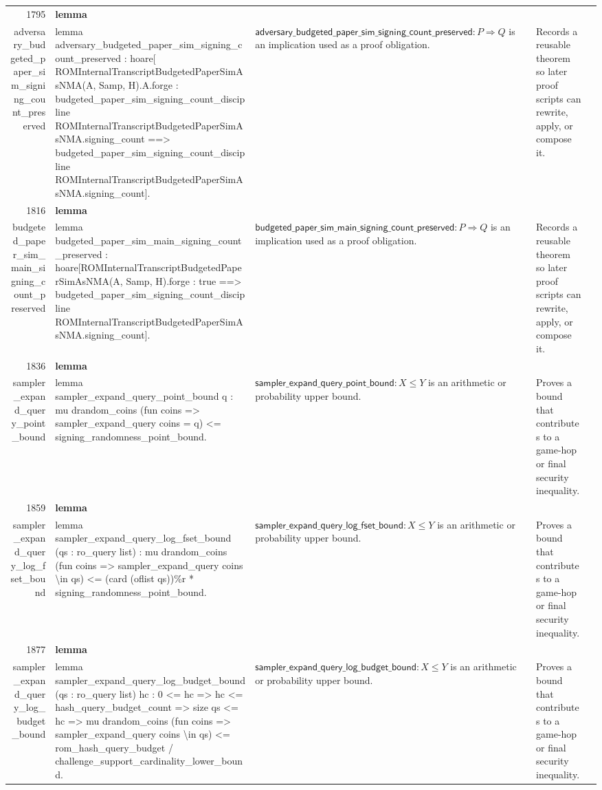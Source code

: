 \documentclass[10pt]{article}
\newcommand{\ec}[1]{\begingroup\ttfamily\scriptsize #1\endgroup}
\begin{document}
\begin{longtable}{r L{0.17\textwidth} L{0.26\textwidth} L{0.27\textwidth} L{0.20\textwidth}}
1795 & \textbf{lemma}\\\ec{adversary\_budgeted\_paper\_sim\_signing\_count\_preserved} & \ec{lemma adversary\_budgeted\_paper\_sim\_signing\_count\_preserved : hoare[ ROMInternalTranscriptBudgetedPaperSimAsNMA(A, Samp, H).A.forge : budgeted\_paper\_sim\_signing\_count\_discipline ROMInternalTranscriptBudgetedPaperSimAsNMA.signing\_count ==> budgeted\_paper\_sim\_signing\_count\_discipline ROMInternalTranscriptBudgetedPaperSimAsNMA.signing\_count].} & \(\mathsf{adversary\_budgeted\_paper\_sim\_signing\_count\_preserved} : P \Rightarrow Q\) is an implication used as a proof obligation. & Records a reusable theorem so later proof scripts can rewrite, apply, or compose it. \\
1816 & \textbf{lemma}\\\ec{budgeted\_paper\_sim\_main\_signing\_count\_preserved} & \ec{lemma budgeted\_paper\_sim\_main\_signing\_count\_preserved : hoare[ROMInternalTranscriptBudgetedPaperSimAsNMA(A, Samp, H).forge : true ==> budgeted\_paper\_sim\_signing\_count\_discipline ROMInternalTranscriptBudgetedPaperSimAsNMA.signing\_count].} & \(\mathsf{budgeted\_paper\_sim\_main\_signing\_count\_preserved} : P \Rightarrow Q\) is an implication used as a proof obligation. & Records a reusable theorem so later proof scripts can rewrite, apply, or compose it. \\
1836 & \textbf{lemma}\\\ec{sampler\_expand\_query\_point\_bound} & \ec{lemma sampler\_expand\_query\_point\_bound q : mu drandom\_coins (fun coins => sampler\_expand\_query coins = q) <= signing\_randomness\_point\_bound.} & \(\mathsf{sampler\_expand\_query\_point\_bound} : X \le Y\) is an arithmetic or probability upper bound. & Proves a bound that contributes to a game-hop or final security inequality. \\
1859 & \textbf{lemma}\\\ec{sampler\_expand\_query\_log\_fset\_bound} & \ec{lemma sampler\_expand\_query\_log\_fset\_bound (qs : ro\_query list) : mu drandom\_coins (fun coins => sampler\_expand\_query coins \textbackslash{}in qs) <= (card (oflist qs))\%r * signing\_randomness\_point\_bound.} & \(\mathsf{sampler\_expand\_query\_log\_fset\_bound} : X \le Y\) is an arithmetic or probability upper bound. & Proves a bound that contributes to a game-hop or final security inequality. \\
1877 & \textbf{lemma}\\\ec{sampler\_expand\_query\_log\_budget\_bound} & \ec{lemma sampler\_expand\_query\_log\_budget\_bound (qs : ro\_query list) hc : 0 <= hc => hc <= hash\_query\_budget\_count => size qs <= hc => mu drandom\_coins (fun coins => sampler\_expand\_query coins \textbackslash{}in qs) <= rom\_hash\_query\_budget / challenge\_support\_cardinality\_lower\_bound.} & \(\mathsf{sampler\_expand\_query\_log\_budget\_bound} : X \le Y\) is an arithmetic or probability upper bound. & Proves a bound that contributes to a game-hop or final security inequality. \\

\end{longtable}
\end{document}
